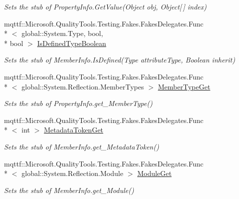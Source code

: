 \begin{DoxyCompactItemize}
\begin{DoxyCompactList}\small\item\em Sets the stub of Property\-Info.\-Get\-Value(\-Object obj, Object\mbox{[}$\,$\mbox{]} index)\end{DoxyCompactList}\item 
mqttf\-::\-Microsoft.\-Quality\-Tools.\-Testing.\-Fakes.\-Fakes\-Delegates.\-Func\\*
$<$ global\-::\-System.\-Type, bool, \\*
bool $>$ \hyperlink{class_system_1_1_reflection_1_1_fakes_1_1_stub_property_info_aad6cd150ade57fee3bd628a0b173ee36}{Is\-Defined\-Type\-Boolean}
\begin{DoxyCompactList}\small\item\em Sets the stub of Member\-Info.\-Is\-Defined(\-Type attribute\-Type, Boolean inherit)\end{DoxyCompactList}\item 
mqttf\-::\-Microsoft.\-Quality\-Tools.\-Testing.\-Fakes.\-Fakes\-Delegates.\-Func\\*
$<$ global\-::\-System.\-Reflection.\-Member\-Types $>$ \hyperlink{class_system_1_1_reflection_1_1_fakes_1_1_stub_property_info_a318c153d510531c40d5c1610ee3a851d}{Member\-Type\-Get}
\begin{DoxyCompactList}\small\item\em Sets the stub of Property\-Info.\-get\-\_\-\-Member\-Type()\end{DoxyCompactList}\item 
mqttf\-::\-Microsoft.\-Quality\-Tools.\-Testing.\-Fakes.\-Fakes\-Delegates.\-Func\\*
$<$ int $>$ \hyperlink{class_system_1_1_reflection_1_1_fakes_1_1_stub_property_info_aac86b19b358c16618c2b4265be88d635}{Metadata\-Token\-Get}
\begin{DoxyCompactList}\small\item\em Sets the stub of Member\-Info.\-get\-\_\-\-Metadata\-Token()\end{DoxyCompactList}\item 
mqttf\-::\-Microsoft.\-Quality\-Tools.\-Testing.\-Fakes.\-Fakes\-Delegates.\-Func\\*
$<$ global\-::\-System.\-Reflection.\-Module $>$ \hyperlink{class_system_1_1_reflection_1_1_fakes_1_1_stub_property_info_a0c0612b33d03bc4a54089cf9088e84e9}{Module\-Get}
\begin{DoxyCompactList}\small\item\em Sets the stub of Member\-Info.\-get\-\_\-\-Module()\end{DoxyCompactList}\item 

\end{DoxyCompactItemize}
